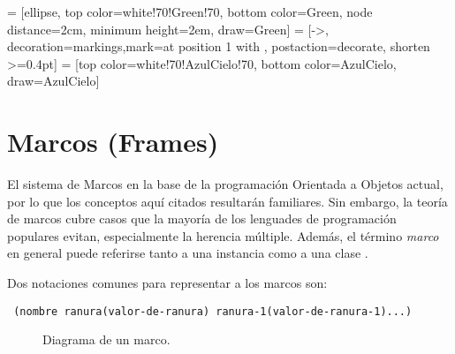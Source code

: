 \usetikzlibrary{shapes,shapes.geometric,arrows,calc,fit,shadows,positioning,decorations.markings}
 = [ellipse, top color=white!70!Green!70, bottom color=Green, node distance=2cm, minimum height=2em, draw=Green]
 = [->, decoration={markings,mark=at position 1 with {\arrow[scale=2]{>}}},
    postaction={decorate},
    shorten >=0.4pt]
 = [top color=white!70!AzulCielo!70, bottom color=AzulCielo, draw=AzulCielo]




%


\section{Marcos (Frames)}

El sistema de Marcos en la base de la programación Orientada a Objetos actual, por lo que los conceptos aquí citados resultarán familiares.  Sin embargo, la teoría de marcos cubre casos que la mayoría de los lenguades de programación populares evitan, especialmente la herencia múltiple.  Además, el término \textit{marco} en general puede referirse tanto a una instancia como a una clase \cite{Winston}.

Dos notaciones comunes para representar a los marcos son:
\begin{lstlisting}
 (nombre ranura(valor-de-ranura) ranura-1(valor-de-ranura-1)...)
\end{lstlisting}

\begin{figure}[H]
\centering
{}
\caption{Diagrama de un marco.}
\end{figure}

